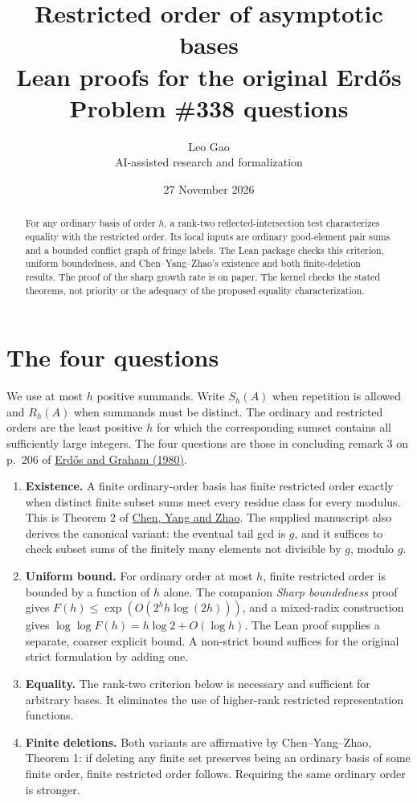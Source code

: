 \documentclass[11pt]{article}
\title{Restricted order of asymptotic bases\\
\large Lean proofs for the original Erd\H{o}s Problem \#338 questions}
\author{Leo Gao\\\small AI-assisted research and formalization}
\date{27 November 2026}
\begin{document}
\maketitle
\begin{abstract}
For any ordinary basis of order $h$, a rank-two reflected-intersection
test characterizes equality with the restricted order. Its local
inputs are ordinary good-element pair sums and a bounded conflict
graph of fringe labels. The Lean package checks this criterion, uniform boundedness, and
Chen--Yang--Zhao's existence and both finite-deletion results.
The proof of the sharp growth rate is on paper. The kernel checks
the stated theorems, not priority or the adequacy of the proposed
equality characterization.
\end{abstract}

\section{The four questions}
We use at most $h$ positive summands. Write $S_h(A)$ when repetition is
allowed and $R_h(A)$ when summands must be distinct. The ordinary
and restricted orders are the least positive $h$ for which the
corresponding sumset contains all sufficiently large integers.
The four questions are those in concluding remark 3 on p.~206 of
\href{https://www.renyi.hu/~p_erdos/1980-22.pdf\#page=6}{Erd\H{o}s and Graham (1980)}.

\begin{enumerate}
\item \textbf{Existence.} A finite ordinary-order basis has finite
restricted order exactly when distinct finite subset sums meet
every residue class for every modulus.
This is Theorem 2 of
\href{https://arxiv.org/html/2611.33191v1}{Chen, Yang and Zhao}.
The supplied manuscript also derives the canonical variant:
the eventual tail gcd is $g$, and it suffices to check subset sums
of the finitely many elements not divisible by $g$, modulo $g$.
\item \textbf{Uniform bound.} For ordinary order at most $h$, finite
restricted order is bounded by a function of $h$ alone.
The companion \emph{Sharp boundedness} proof gives
$F(h)\le \exp(O(2^h h\log(2h)))$, and a mixed-radix construction
gives $\log\log F(h)=h\log2+O(\log h)$.
The Lean proof supplies a separate, coarser explicit bound.
A non-strict bound suffices for the original strict formulation by adding one.
\item \textbf{Equality.} The rank-two criterion below is necessary
and sufficient for arbitrary bases. It eliminates the use of
higher-rank restricted representation functions.
\item \textbf{Finite deletions.} Both variants are affirmative by
Chen--Yang--Zhao, Theorem 1: if deleting any finite set preserves
being an ordinary basis of some finite order, finite restricted
order follows. Requiring the same ordinary order is stronger.
\end{enumerate}
\end{document}
